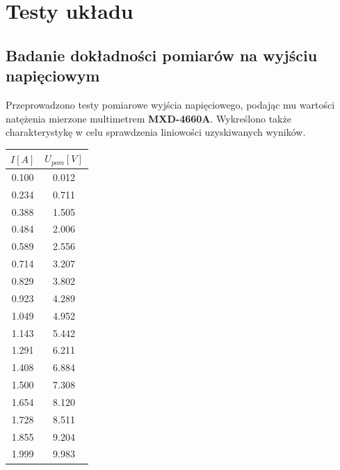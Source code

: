 \documentclass[12pt]{article}
\begin{document}
\section{Testy układu}
\subsection{Badanie dokładności pomiarów na wyjściu napięciowym}
Przeprowadzono testy pomiarowe wyjścia napięciowego, podając mu wartości natężenia mierzone multimetrem \textbf{MXD-4660A}. Wykreślono także charakterystykę w celu sprawdzenia liniowości uzyskiwanych wyników. \\

\begin{minipage}[c]{0.3\textwidth}
\centering
\begin{tabular}{|c|c|}
\hline
		\cellcolor[gray]{0.9}$I [A]$ & \cellcolor[gray]{0.9}$U_{pom} [V]$ \\
		\hline
		0.100 & 0.012 \\
		\hline
		0.234 & 0.711 \\
		\hline
		0.388 & 1.505 \\
		\hline
		0.484 & 2.006 \\
		\hline
		0.589 & 2.556 \\
		\hline
		0.714 & 3.207 \\
		\hline
		0.829 & 3.802 \\
		\hline
		0.923 & 4.289 \\
		\hline
		1.049 & 4.952 \\
		\hline
		1.143 & 5.442 \\
		\hline
		1.291 & 6.211 \\
		\hline
		1.408 & 6.884 \\
		\hline
		1.500 & 7.308 \\
		\hline 
		1.654 & 8.120 \\
		\hline
		1.728 & 8.511 \\
		\hline
		1.855 & 9.204 \\
		\hline
		1.999 & 9.983 \\
		\hline
\end{tabular}
\end{minipage}
\end{document}
